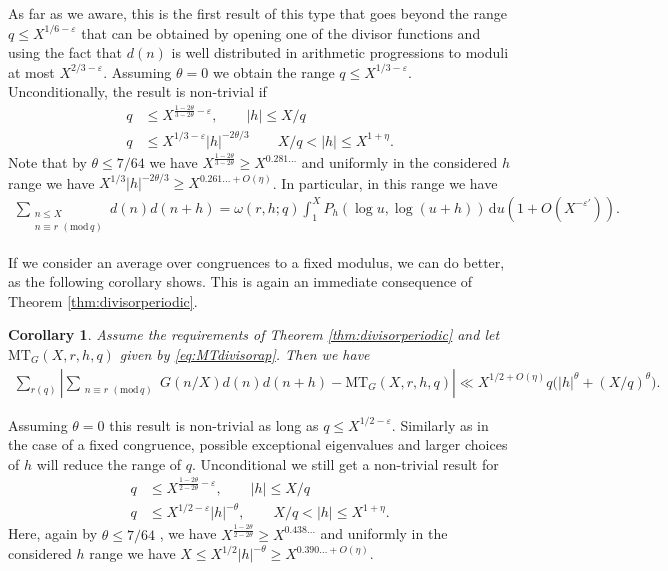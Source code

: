 \documentclass[12pt]{amsart}
\newtheorem{corollary}[theorem]{Corollary}
\theoremstyle{definition}
\theoremstyle{remark}
\numberwithin{equation}{section}
\newcommand{\1}{{\mathbf 1}}
\newcommand{\eps}{\varepsilon}
\renewcommand{\d}{\mathrm d}
\renewcommand{\pmod}[1]{\,\,(\mathrm{mod}\,{#1})}
\begin{document}
As far as we aware, this is the first result of this type that goes beyond the range $q\leq X^{1/6-\eps}$ that can be obtained by opening one of the divisor functions and using the fact that $d(n)$ is well distributed in arithmetic progressions to moduli at most $X^{2/3-\eps}$. Assuming $\theta=0$ we obtain the range $q \leq X^{1/3-\eps}$.  Unconditionally, the result is non-trivial if
\begin{align*}
   q & \leq X^{\frac{1-2\theta}{3-2\theta } - \eps} , \quad \quad  |h| \leq X/q \\
  q  &\leq X^{1/3-\eps} |h|^{ -2\theta/3} \quad \quad X/q < |h| \leq X^{1+\eta}.
\end{align*}
Note that by $\theta \leq 7/64$ \cite{KimSarnak} we have $X^{\frac{1-2\theta}{3-2\theta }}\geq X^{0.281\ldots} $ and uniformly in the considered $h$ range we have $X^{1/3} |h|^{ -2\theta/3} \geq  X^{0.261\ldots + O(\eta)}$. In particular, in this range we have 
\begin{align*}
        \sum_{\substack{ n \leq X \\ n\equiv r \pmod{q}}}  d(n) d(n+h)=   \omega(r,h;q)  \int_1^X   P_h( \log u,\log(u+h)) \,\d u(1+O(X^{-\eps'})).
    \end{align*}

If we consider an average over congruences to a fixed modulus, we can do better, as the following corollary shows. This is again an immediate consequence of Theorem \ref{thm:divisorperiodic}.
\begin{corollary}\label{cor:averageap} Assume the requirements of Theorem \ref{thm:divisorperiodic} and let $ \mathrm{MT}_G(X,r,h,q)$ given by \eqref{eq:MTdivisorap}. Then we have
    \begin{align*}
       \sum_{r(q)}  \left| \sum_{\substack{ n\equiv r \pmod{q}}}G(n/X)d(n) d(n+h)- \mathrm{MT}_G(X,r,h,q)\right| \ll X^{1/2+O(\eta)} q\bigg(|h|^{\theta}+(X/q)^{\theta}  \bigg).
    \end{align*}
\end{corollary}


Assuming $\theta=0$ this result is non-trivial as long as $q\leq X^{1/2-\eps}$. Similarly as in the case of a fixed congruence, possible exceptional eigenvalues and larger choices of $h$ will reduce the range of $q$. Unconditional we still get a non-trivial result for 
\begin{align*}
   q & \leq X^{\frac{1-2\theta}{2-2\theta } - \eps} , \quad \quad  |h| \leq X/q \\
  q  &\leq X^{1/2-\eps} |h|^{ -\theta} , \quad \quad X/q < |h| \leq X^{1+\eta}.
\end{align*}
Here, again by $\theta \leq 7/64$ \cite{KimSarnak}, we have $X^{\frac{1-2\theta}{2-2\theta }}\geq X^{0.438\ldots} $ and uniformly in the considered $h$ range we have $X\leq X^{1/2} |h|^{ -\theta} \geq  X^{0.390\ldots + O(\eta)}$.
\end{document}
